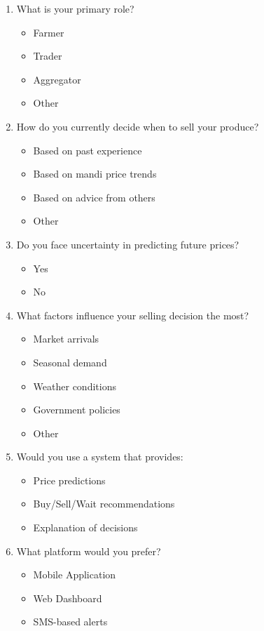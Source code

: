 \documentclass[12pt,a4paper]{report}
\begin{document}
\begin{enumerate}
    \item What is your primary role?
    \begin{itemize}
        \item Farmer
        \item Trader
        \item Aggregator
        \item Other
    \end{itemize}

    \item How do you currently decide when to sell your produce?
    \begin{itemize}
        \item Based on past experience
        \item Based on mandi price trends
        \item Based on advice from others
        \item Other
    \end{itemize}

    \item Do you face uncertainty in predicting future prices?
    \begin{itemize}
        \item Yes
        \item No
    \end{itemize}

    \item What factors influence your selling decision the most?
    \begin{itemize}
        \item Market arrivals
        \item Seasonal demand
        \item Weather conditions
        \item Government policies
        \item Other
    \end{itemize}

    \item Would you use a system that provides:
    \begin{itemize}
        \item Price predictions
        \item Buy/Sell/Wait recommendations
        \item Explanation of decisions
    \end{itemize}

    \item What platform would you prefer?
    \begin{itemize}
        \item Mobile Application
        \item Web Dashboard
        \item SMS-based alerts
    \end{itemize}
\end{enumerate}
\end{document}
